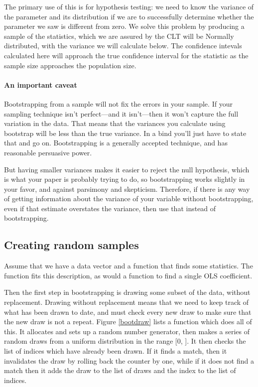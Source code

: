 The primary use of this is for hypothesis testing: we need to know the
variance of the parameter and its distribution if we are to successfully
determine whether the parameter we saw is different from zero. We
solve this problem by producing a sample of the statistics, which we
are assured by the CLT will be Normally distributed, with the variance
we will calculate below. The confidence intevals calculated here will
approach the true confidence interval for the statistic
as the sample size approaches the population size.

\paragraph{An important caveat} Bootstrapping from a sample will not fix
the errors in your sample. If your sampling technique isn't perfect---and
it isn't---then it won't capture the full variation in the data. That
means that the variances you calculate using bootstrap will be less than
the true variance. In a bind you'll just have
to state that and go on. Bootstrapping is a generally accepted technique,
and has reasonable persuasive power.

But having smaller variances makes
it easier to reject the null hypothesis, which is what your paper is
probably trying to do, so bootstrapping works slightly in your favor,
and against parsimony and skepticism. Therefore, if there is any way
of getting information about the variance of your variable without
bootstrapping, even if that estimate overstates the variance, then use
that instead of bootstrapping. 


\subsection{Creating random samples} Assume that we have a
data vector  and a function  that finds some statistics. The
function  fits this description, as would a function to find
a single OLS coefficient.

Then the first step in bootstrapping is drawing some subset of the data,
without replacement. Drawing without replacement means that we need to
keep track of what has been drawn to date, and must check every new draw
to make sure that the new draw is not a repeat. Figure \ref{bootdraw} lists a function which
does all of this. It allocates and sets up a random number generator, then
makes a series of random draws from a uniform distribution in the range
[0, ]. It then checks the list of indices which have
already been drawn. If it finds a match, then it invalidates the draw
by rolling back the counter by one, while if it does not find a match then it
adds the draw to the list of draws and the index to the list of indices.

